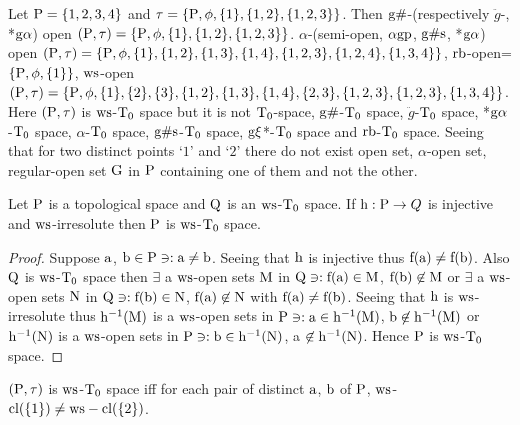 \begin{exm}\label{exam8.2.4}
Let $\mathrm{P}= \{1,2,3,4\}$ and $\tau =\{\mathrm{P}, \phi, \{1\}, \{1,2\},\{1, 2 ,3\}\}$. Then $\mathrm{g}\#$-(respectively $\ddot{g}$-, *$\mathrm{g}\alpha$) open $(\mathrm{P}, \tau)=\{\mathrm{P}, \phi, \{1\}, \{1,2\},\{1, 2,3\}\}$. $\alpha$-(semi-open, $\alpha\mathrm{g}\mathrm{p}$, $\mathrm{g}\#\mathrm{s}$, *$\mathrm{g}\alpha$) open $(\mathrm{P}, \tau) =\{\mathrm{P},\phi, \{1\}, \{1,2\},\{1,3\},\{1,4\},\{1,2,3\},\{1,2,4\},\{1,3,4\}\}$, $\mathrm{rb}$-open=$\{\mathrm{P}, \phi, \{1\}\}$, $\mathrm{ws}$-open $(\TSP, \tau)=\{\TSP,\phi, \{1\},\{2\},\{3\},\{1,2\},\{1,3\},\{1,4\},\break \{2,3\},\{1, 2, 3\},\{1,2, 3\},\{1, 3, 4\}\}$. Here $(\mathrm{P}, \tau)$ is $\mathrm{ws}$-$\mathrm{T}_{0}$ space but it is not $\mathrm{T}_{0}$-space, $\mathrm{g}\#$-$\mathrm{T}_{0}$ space, $\ddot{g}$-$\mathrm{T}_{0}$ space, *$\mathrm{g}\alpha$-$\mathrm{T}_{0}$ space, $\alpha$-$\mathrm{T}_{0}$ space, $\mathrm{g}\#\mathrm{s}$-$\mathrm{T}_{0}$ space, $\mathrm{g}\xi$*-$\mathrm{T}_{0}$ space and $\mathrm{rb}$-$\mathrm{T}_{0}$ space. Seeing that for two distinct points `$1$' and `$2$' there do not exist open set, $\alpha$-open set, regular-open set $\mathrm{G}$ in $\mathrm{P}$ containing one of them and not the other.
\end{exm}

\begin{thm}\label{thm8.2.5}
Let $\mathrm{P}$ is a topological space and $\mathrm{Q}$ is an $\mathrm{ws}$-$\mathrm{T}_{0}$ space. If $\mathrm{h}: \mathrm{P} \to Q$ is injective and $\mathrm{ws}$-irresolute then $\mathrm{P}$ is $\mathrm{ws}$-$\mathrm{T}_{0}$ space.
\end{thm}

\begin{proof}
Suppose $\mathrm{a}$, $\mathrm{b} \in \mathrm{P} \ni:\mathrm{a} \neq \mathrm{b}$. Seeing that $\mathrm{h}$ is injective thus $\mathrm{f}(\mathrm{a}) \neq \mathrm{f}(\mathrm{b})$. Also $\mathrm{Q}$ is $\mathrm{ws}$-$\mathrm{T}_{0}$ space then $\exists$ a $\mathrm{ws}$-open sets $\mathrm{M}$ in $\mathrm{Q} \ni: \mathrm{f}(\mathrm{a}) \in \mathrm{M}$, $\mathrm{f}(\mathrm{b}) \not\in \mathrm{M}$ or $\exists$  a $\mathrm{ws}$-open sets $\mathrm{N}$ in $\mathrm{Q} \ni :\mathrm{f}(\mathrm{b}) \in \mathrm{N}$, $\mathrm{f}(\mathrm{a}) \not\in \mathrm{N}$ with $\mathrm{f}(\mathrm{a}) \neq \mathrm{f}(\mathrm{b})$. Seeing that $\mathrm{h}$ is $\mathrm{ws}$-irresolute thus $\mathrm{h}^{-1} (\mathrm{M})$ is a $\mathrm{ws}$-open sets in $\mathrm{P} \ni: \mathrm{a} \in \mathrm{h}^{-1} (\mathrm{M})$, $\mathrm{b} \not\in \mathrm{h}^{-1} (\mathrm{M})$ or $\mathrm{h}^{-1} (\mathrm{N})$ is a $\mathrm{ws}$-open sets in $\mathrm{P} \ni:\mathrm{b} \in \mathrm{h}^{-1} (\mathrm{N})$, a $\not\in \mathrm{h}^{-1} (\mathrm{N})$. Hence $\mathrm{P}$ is $\mathrm{ws}$-$\mathrm{T}_{0}$ space.
\end{proof}

\begin{thm}\label{thm8.2.6}
$(\mathrm{P}, \tau)$ is $\mathrm{ws}$-$\mathrm{T}_{0}$ space iff for each pair of distinct $\mathrm{a}$, $\mathrm{b}$ of $\mathrm{P}$, $\mathrm{ws}$-$\mathrm{cl}(\{1\}) \neq \mathrm{ws}-\mathrm{cl}(\{2\})$.
\end{thm}

